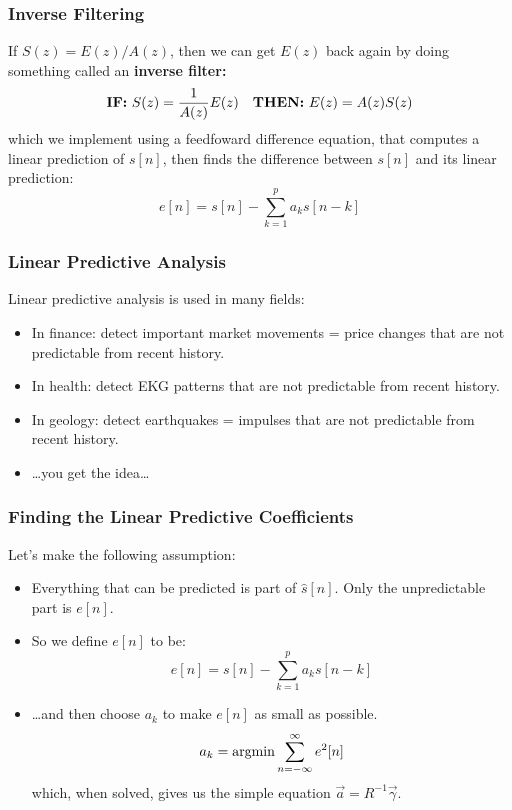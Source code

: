 \documentclass{beamer}
\newcommand{\argmin}{\operatornamewithlimits{argmin}}
\begin{document}
\begin{frame}
  \frametitle{Inverse Filtering}

  If $S(z) = E(z)/A(z)$, then we can get $E(z)$ back again by doing
  something called an {\bf inverse filter:}
  \begin{displaymath}
    \mbox{\bf IF:}~S(z) = \frac{1}{A(z)}E(z)~~~
    \mbox{\bf THEN:}~E(z) = A(z)S(z)
  \end{displaymath}
  which we implement using a feedfoward difference equation, that
  computes a linear prediction of $s[n]$, then finds the difference
  between $s[n]$ and its linear prediction:
  \begin{displaymath}
    e[n] = s[n] - \sum_{k=1}^p a_k s[n-k]
  \end{displaymath}
\end{frame}

\begin{frame}
  \frametitle{Linear Predictive Analysis}

  Linear predictive analysis is used in many fields:
  \begin{itemize}
  \item In finance: detect important market movements = price changes
    that are not predictable from recent history.
  \item In health: detect EKG patterns that are not predictable from
    recent history.
  \item In geology: detect earthquakes = impulses that are not
    predictable from recent history.
  \item \ldots you get the idea\ldots
  \end{itemize}
\end{frame}
    
\begin{frame}
  \frametitle{Finding the Linear Predictive Coefficients}

  Let's make the following assumption:
  \begin{itemize}
  \item Everything that can be predicted is part of $\hat{s}[n]$.
    Only the unpredictable part is $e[n]$.
  \item So we define $e[n]$ to be:
    \begin{displaymath}
      e[n] = s[n] -\sum_{k=1}^p a_k s[n-k]
    \end{displaymath}
  \item \ldots and then choose $a_k$ to make $e[n]$ as small as possible.
    \begin{displaymath}
      a_k = \argmin \sum_{n=-\infty}^\infty e^2[n]
    \end{displaymath}
    which, when solved, gives us the simple equation $\vec{a}=R^{-1}\vec\gamma$.
  \end{itemize}
\end{frame}
  
  
\end{document}
